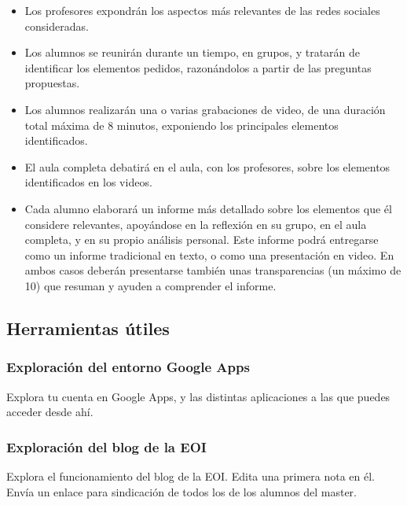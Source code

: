 \documentclass[a4paper,12pt]{article}
\begin{document}
\begin{itemize}
\item Los profesores expondrán los aspectos más relevantes de las redes sociales consideradas.
\item Los alumnos se reunirán durante un tiempo, en grupos, y tratarán de identificar los elementos pedidos, razonándolos a partir de las preguntas propuestas.
\item Los alumnos realizarán una o varias grabaciones de video, de una duración total máxima de 8 minutos, exponiendo los principales elementos identificados.
\item El aula completa debatirá en el aula, con los profesores, sobre los elementos identificados en los videos.
\item Cada alumno elaborará un informe más detallado sobre los elementos que él considere relevantes, apoyándose en la reflexión en su grupo, en el aula completa, y en su propio análisis personal. Este informe podrá entregarse como un informe tradicional en texto, o como una presentación en video. En ambos casos deberán presentarse también unas transparencias (un máximo de 10) que resuman y ayuden a comprender el informe.
\end{itemize}

\subsection{Herramientas útiles}

\subsubsection{Exploración del entorno Google Apps}
\label{sub:googleapps}

Explora tu cuenta en Google Apps, y las distintas aplicaciones a las que puedes acceder desde ahí.

\subsubsection{Exploración del blog de la EOI}
\label{sub:blog}

Explora el funcionamiento del blog de la EOI. Edita una primera nota en él. Envía un enlace para sindicación de todos los de los alumnos del master.
\end{document}
